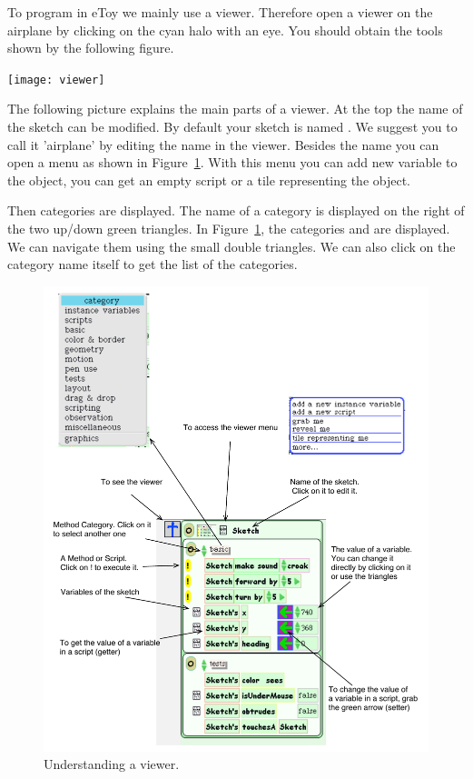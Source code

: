 To program in eToy we mainly use a viewer. Therefore open a viewer on the airplane by clicking on the cyan halo with an eye. You should obtain the tools shown by the following figure.

\begin{center}\texttt{[image: viewer]}\end{center}

The following picture explains the main parts of a viewer. At the top the name of the sketch can be modified. By default your sketch is named . We suggest you to call it 'airplane' by editing the name in the viewer. Besides the name you can open a menu as shown in Figure~\ref{fig:x}. With this menu you can add new variable to the object, you can get an empty script or a tile representing the object.

Then categories are displayed. The name of a category is displayed on the right of the two up/down green triangles. In Figure~\ref{fig:x}, the categories  and  are displayed. We can navigate them using the small double triangles. We can also click on the category name itself to get the list of the categories.

\begin{figure}[h]
\begin{center}\includegraphics[width=12cm]{explainingViewer2}\end{center} \caption{Understanding a viewer.\label{fig:x}}
\end{figure}

